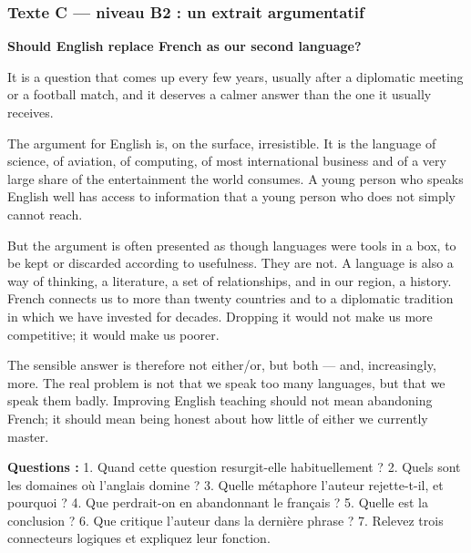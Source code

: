 \subsubsection*{Texte C --- niveau B2 : un extrait argumentatif}
\begin{dialoguebox}[Texte C]
\begin{anglais}
\textbf{Should English replace French as our second language?}

It is a question that comes up every few years, usually after a diplomatic meeting or a
football match, and it deserves a calmer answer than the one it usually receives.

The argument for English is, on the surface, irresistible. It is the language of science, of
aviation, of computing, of most international business and of a very large share of the
entertainment the world consumes. A young person who speaks English well has access to
information that a young person who does not simply cannot reach.

But the argument is often presented as though languages were tools in a box, to be kept or
discarded according to usefulness. They are not. A language is also a way of thinking, a
literature, a set of relationships, and in our region, a history. French connects us to more
than twenty countries and to a diplomatic tradition in which we have invested for decades.
Dropping it would not make us more competitive; it would make us poorer.

The sensible answer is therefore not either/or, but both --- and, increasingly, more. The
real problem is not that we speak too many languages, but that we speak them badly. Improving
English teaching should not mean abandoning French; it should mean being honest about how
little of either we currently master.
\end{anglais}
\end{dialoguebox}

\textbf{Questions :} 1. Quand cette question resurgit-elle habituellement ? 2. Quels sont les
domaines où l'anglais domine ? 3. Quelle métaphore l'auteur rejette-t-il, et pourquoi ?
4. Que perdrait-on en abandonnant le français ? 5. Quelle est la conclusion ?
6. Que critique l'auteur dans la dernière phrase ? 7. Relevez trois connecteurs logiques et
expliquez leur fonction.

